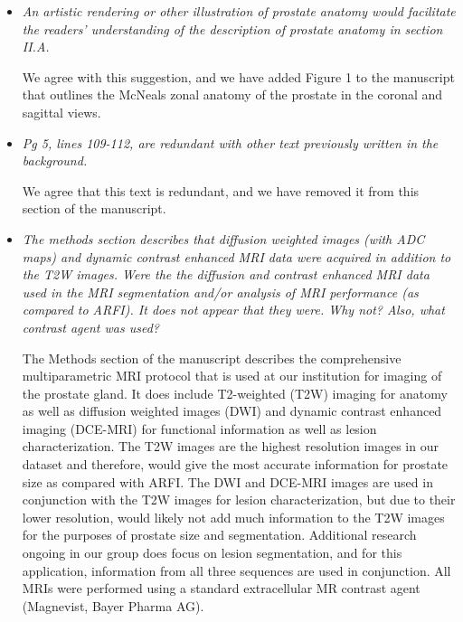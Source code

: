 \documentclass[10pt]{article}
\begin{document}
\begin{itemize}

    \item \textit{An artistic rendering or other illustration of prostate
            anatomy would facilitate the readers' understanding of the
            description of prostate anatomy in section II.A.}

    We agree with this suggestion, and we have added Figure 1 to the manuscript
    that outlines the McNeals zonal anatomy of the prostate in the coronal and
    sagittal views.

    \item \textit{Pg 5, lines 109-112, are redundant with other text previously
            written in the background.}

    We agree that this text is redundant, and we have removed it from this
    section of the manuscript.

    \item \textit{The methods section describes that diffusion weighted images
            (with ADC maps) and dynamic contrast enhanced MRI data were
            acquired in addition to the T2W images.  Were the the diffusion and
            contrast enhanced MRI data used in the MRI segmentation and/or
            analysis of MRI performance (as compared to ARFI).  It does not
            appear that they were.  Why not?  Also, what contrast agent was
            used?}

    The Methods section of the manuscript describes the comprehensive
    multiparametric MRI protocol that is used at our institution for imaging of
    the prostate gland.  It does include T2-weighted (T2W) imaging for anatomy
    as well as diffusion weighted images (DWI) and dynamic contrast enhanced
    imaging (DCE-MRI) for functional information as well as lesion
    characterization.  The T2W images are the highest resolution images in our
    dataset and therefore, would give the most accurate information for
    prostate size as compared with ARFI.  The DWI and DCE-MRI images are used
    in conjunction with the T2W images for lesion characterization, but due to
    their lower resolution, would likely not add much information to the T2W
    images for the purposes of prostate size and segmentation.  Additional
    research ongoing in our group does focus on lesion segmentation, and for
    this application, information from all three sequences are used in
    conjunction. All MRIs were performed using a standard extracellular MR
    contrast agent (Magnevist, Bayer Pharma AG). 


\end{itemize}
\end{document}
